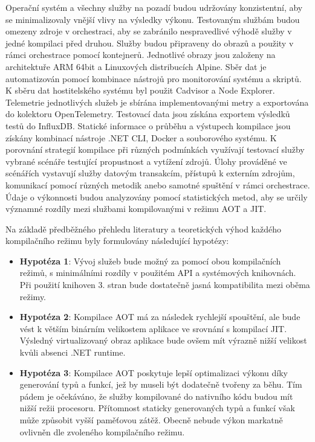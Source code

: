 Operační systém a všechny služby na pozadí budou udržovány konzistentní, aby se minimalizovaly vnější vlivy na výsledky výkonu. Testovaným službám budou omezeny zdroje v orchestraci, aby se zabránilo nespravedlivé výhodě služby v jedné kompilaci před druhou. Služby budou připraveny do obrazů a použity v rámci orchestrace pomocí kontejnerů. Jednotlivé obrazy jsou založeny na architektuře ARM 64bit a Linuxových distribucích Alpine. Sběr dat je automatizován pomocí kombinace nástrojů pro monitorování systému a skriptů. K sběru dat hostitelského systému byl použit Cadvisor a Node Explorer. Telemetrie jednotlivých služeb je sbírána implementovanými metry a exportována do kolektoru OpenTelemetry. Testovací data jsou získána exportem výsledků testů do InfluxDB. Statické informace o průběhu a výstupech kompilace jsou získány kombinací nástroje .NET CLI, Docker a souborového systému. K porovnání strategií kompilace při různých podmínkách využívají testovací služby vybrané scénáře testující propustnost a vytížení zdrojů. Úlohy prováděné ve scénářích vystavují služby datovým transakcím, přístupů k externím zdrojům, komunikací pomocí různých metodik anebo samotné spuštění v rámci orchestrace. Údaje o výkonnosti budou analyzovány pomocí statistických metod, aby se určily významné rozdíly mezi službami kompilovanými v režimu AOT a JIT. 

Na základě předběžného přehledu literatury a teoretických výhod každého kompilačního režimu byly formulovány následující hypotézy:

\begin{itemize}
    \item \textbf{Hypotéza 1}: Vývoj služeb bude možný za pomocí obou kompilačních režimů, s minimálními rozdíly v použitém API a systémových knihovnách. Při použití knihoven 3. stran bude dostatečně jasná kompatibilita mezi oběma režimy.
    \item \textbf{Hypotéza 2}: Kompilace AOT má za následek rychlejší spouštění, ale bude vést k větším binárním velikostem aplikace ve srovnání s kompilací JIT. Výsledný virtualizovaný obraz aplikace bude ovšem mít výrazně nižší velikost kvůli absenci .NET runtime.
    \item \textbf{Hypotéza 3}: Kompilace AOT poskytuje lepší optimalizaci výkonu díky generování typů a funkcí, jež by museli být dodatečně tvořeny za běhu. Tím pádem je očekáváno, že služby kompilované do nativního kódu budou mít nižší režii procesoru. Přítomnost staticky generovaných typů a funkcí však může způsobit vyšší paměťovou zátěž. Obecně nebude výkon markatně ovlivněn dle zvoleného kompilačního režimu.
\end{itemize}

